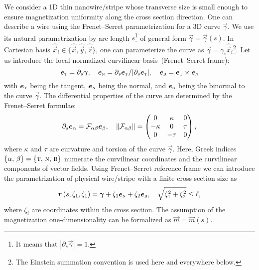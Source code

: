 We consider a 1D thin nanowire/stripe whose transverse size is small enough to ensure magnetization uniformity along the cross section direction. One can describe a wire using the Frenet--Serret parametrization for a 3D curve $\vec{\gamma}$. We use its natural parametrization by arc length $s$\footnote{It means that $|\partial_s\vec{\gamma}|=1$.} of general form $\vec{\gamma}=\vec{\gamma}(s)$. In Cartesian basis $\hat{\vec{x}}_i\in\{\hat{\vec{x}},\hat{\vec{y}},\hat{\vec{z}}\}$, one can parameterize the curve as $\vec{\gamma}=\gamma_i\hat{\vec{x}}_i$\footnote{The Einstein summation convention is used here and everywhere below.}. Let
us introduce the local normalized curvilinear basis~(Frenet--Serret frame):
\begin{equation}\label{eq:FrenetSerret_basis}
	\vec{e}_\textsc{t}=\partial_s \vec{\gamma},\quad \vec{e}_\textsc{n}=\partial_s\vec{e}_\textsc{t}/|\partial_s\vec{e}_\textsc{t}|,\quad \vec{e}_\textsc{b}=\vec{e}_\textsc{t}\times\vec{e}_\textsc{n}
\end{equation}
with $\vec{e}_\textsc{t}$ being the tangent, $\vec{e}_\textsc{n}$ being the normal, and $\vec{e}_\textsc{b}$ being the binormal to the curve $\vec{\gamma}$. The differential properties of the curve are determined by the Frenet--Serret formulae:
\begin{equation}\notag%
	\partial_s\vec{e}_\alpha = \mathcal{F}_{\alpha\beta}\vec{e}_\beta,\quad \|\mathcal{F}_{\alpha\beta}\|=\left(
		\begin{matrix}
			0&\kappa&0\\
			-\kappa&0&\tau\\
			0&-\tau&0
		\end{matrix}\right),
\end{equation}
where $\kappa$ and $\tau$ are curvature and torsion of the curve $\vec{\gamma}$. Here, Greek indices $\{\alpha,\, \beta\} = \{\textsc{t},\, \textsc{n},\, \textsc{b}\}$ numerate the curvilinear coordinates and the curvilinear components of vector fields.
Using Frenet--Serret reference frame we can introduce the parametrization of physical wire/stripe with a finite cross section size as
\begin{equation}\notag
\vec{r}\left(s,\zeta_1,\zeta_1\right)=\vec{\gamma}+\zeta_1\vec{e}_\textsc{n}+\zeta_2\vec{e}_\textsc{b},\quad \sqrt{\zeta_1^2+\zeta_2^2}\leq \ell,
\end{equation}
where $\zeta_i$ are coordinates within the cross section. The assumption of the magnetization one-dimensionality can be formalized as $\vec{m}=\vec{m}(s)$.

